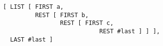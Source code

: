 \documentclass[a4paper]{article}
\begin{document}
{\small\begin{verbatim}
[ LIST [ FIRST a,
         REST [ FIRST b, 
                REST [ FIRST c,
	                       REST #last ] ] ],
  LAST #last ]
\end{verbatim}}
\end{document}
